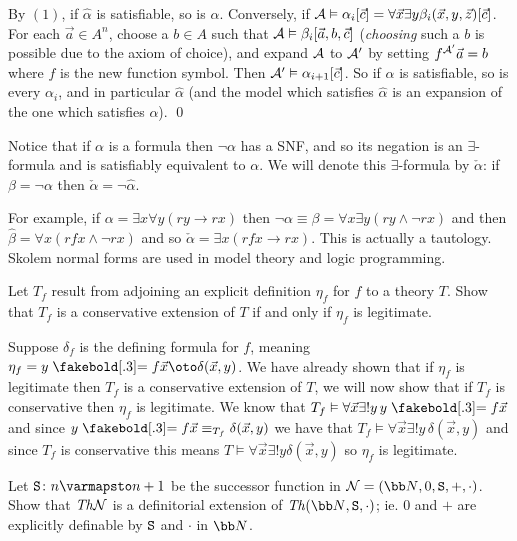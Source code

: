 By $(1)$, if $\hat\alpha$ is satisfiable, so is $\alpha$.
Conversely, if ${\cal A}\vDash\alpha_i[\vec c]=\forall\vec x\exists y\beta_i(\vec x,y,\vec z)[\vec c]$.
For each $\vec a\in A^n$, choose a $b\in A$ such that ${\cal A}\vDash\beta_i[\vec a,b,\vec c]$ ({\it choosing} such a $b$ is possible due to the axiom of choice), and expand ${\cal A}$ to ${\cal A'}$ by
setting $f^{\cal A'}\vec a=b$ where $f$ is the new function symbol.
Then ${\cal A'}\vDash\alpha_{i+1}[\vec c]$.
So if $\alpha$ is satisfiable, so is every $\alpha_i$, and in particular $\hat\alpha$ (and the model which satisfies $\hat\alpha$ is an expansion of the one which satisfies $\alpha$).
\qed

Notice that if $\alpha$ is a formula then $\neg\alpha$ has a SNF, and so its negation is an $\exists$-formula and is satisfiably equivalent to $\alpha$.
We will denote this $\exists$-formula by $\check\alpha$: if $\beta=\neg\alpha$ then $\check\alpha=\neg\hat\alpha$.

For example, if $\alpha=\exists x\forall y(ry\to rx)$ then $\neg\alpha\equiv\beta=\forall x\exists y(ry\land\neg rx)$ and then $\hat\beta=\forall x(rfx\land\neg rx)$ and so
$\check\alpha=\exists x(rfx\to rx)$.
This is actually a tautology.
Skolem normal forms are used in model theory and logic programming.

\bexerc

    Let $T_f$ result from adjoining an explicit definition $\eta_f$ for $f$ to a theory $T$.
    Show that $T_f$ is a conservative extension of $T$ if and only if $\eta_f$ is legitimate.

\eexerc

Suppose $\delta_f$ is the defining formula for $f$, meaning $\eta_f=y\eq f\vec x\oto\delta(\vec x,y)$.
We have already shown that if $\eta_f$ is legitimate then $T_f$ is a conservative extension of $T$, we will now show that if $T_f$ is conservative then $\eta_f$ is legitimate.
We know that $T_f\vDash\forall\vec x\exists!y\,y\eq f\vec x$ and since $y\eq f\vec x\equiv_{T_f}\delta(\vec x,y)$ we have that $T_f\vDash\forall\vec x\exists!y\,\delta(\vec x,y)$ and since $T_f$ is
conservative this means $T\vDash\forall\vec x\exists!y\delta(\vec x,y)$ so $\eta_f$ is legitimate.

\bexerc

    Let ${\tt S}\colon n\varmapsto n+1$ be the successor function in ${\cal N}=({\bb N},0,{\tt S},+,\cdot)$.
    Show that ${\it Th}{\cal N}$ is a definitorial extension of $\Th({\bb N},{\tt S},\cdot)$; ie. $0$ and $+$ are explicitly definable by ${\tt S}$ and $\cdot$ in ${\bb N}$.

